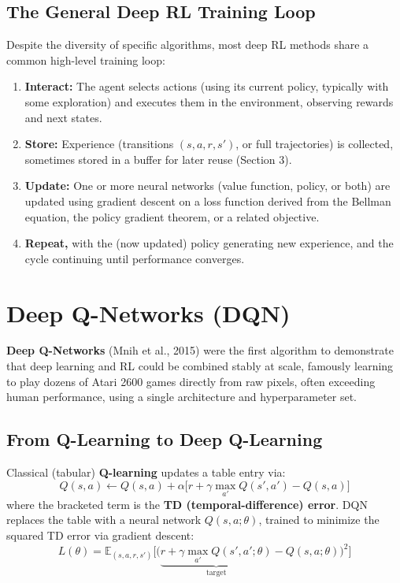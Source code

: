 \documentclass[12pt,a4paper]{article}
\begin{document}
\subsection{The General Deep RL Training Loop}

Despite the diversity of specific algorithms, most deep RL methods share a common high-level training loop:

\begin{enumerate}[leftmargin=1.5em]
    \item \textbf{Interact:} The agent selects actions (using its current policy, typically with some exploration) and executes them in the environment, observing rewards and next states.
    \item \textbf{Store:} Experience (transitions $(s,a,r,s')$, or full trajectories) is collected, sometimes stored in a buffer for later reuse (Section 3).
    \item \textbf{Update:} One or more neural networks (value function, policy, or both) are updated using gradient descent on a loss function derived from the Bellman equation, the policy gradient theorem, or a related objective.
    \item \textbf{Repeat,} with the (now updated) policy generating new experience, and the cycle continuing until performance converges.
\end{enumerate}

\newpage

\section{Deep Q-Networks (DQN)}

\textbf{Deep Q-Networks} (Mnih et al., 2015) were the first algorithm to demonstrate that deep learning and RL could be combined stably at scale, famously learning to play dozens of Atari 2600 games directly from raw pixels, often exceeding human performance, using a single architecture and hyperparameter set.

\subsection{From Q-Learning to Deep Q-Learning}

Classical (tabular) \textbf{Q-learning} updates a table entry via:
\[
Q(s,a) \leftarrow Q(s,a) + \alpha\Big[r + \gamma \max_{a'} Q(s',a') - Q(s,a)\Big]
\]
where the bracketed term is the \textbf{TD (temporal-difference) error}. DQN replaces the table with a neural network $Q(s,a;\theta)$, trained to minimize the squared TD error via gradient descent:
\[
L(\theta) = \mathbb{E}_{(s,a,r,s')}\Big[\big(\underbrace{r + \gamma \max_{a'} Q(s',a';\theta)}_{\text{target}} - Q(s,a;\theta)\big)^2\Big]
\]
\end{document}
